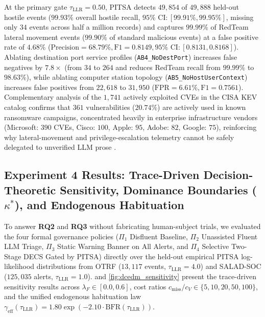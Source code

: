 \documentclass[11pt,a4paper]{article}
\let\oldtexttt\texttt
\renewcommand{\texttt}[1]{\textnormal{\oldtexttt{#1}}}
\begin{document}
At the primary gate $\tau_{\text{LLR}} = 0.50$, PITSA detects $49,854$ of $49,888$ held-out hostile events ($99.93\%$ overall hostile recall, $95\%\text{ CI}: [99.91\%, 99.95\%]$, missing only $34$ events across half a million records) and captures $99.99\%$ of RedTeam lateral movement events ($99.90\%$ of standard malicious events) at a false positive rate of $4.68\%$ ($\text{Precision} = 68.79\%, \text{F1} = 0.8149, 95\%\text{ CI}: [0.8131, 0.8168]$). Ablating destination port service profiles (\texttt{AB4\_NoDestPort}) increases false negatives by $7.8\times$ (from $34$ to $264$ and reduces RedTeam recall from $99.99\%$ to $98.63\%$), while ablating computer station topology (\texttt{AB5\_NoHostUserContext}) increases false positives from $22,618$ to $31,950$ ($\text{FPR} = 6.61\%, \text{F1} = 0.7561$). Complementary analysis of the $1,741$ actively exploited CVEs in the CISA KEV catalog confirms that $361$ vulnerabilities ($20.74\%$) are actively used in known ransomware campaigns, concentrated heavily in enterprise infrastructure vendors (Microsoft: $390$ CVEs, Cisco: $100$, Apple: $95$, Adobe: $82$, Google: $75$), reinforcing why lateral-movement and privilege-escalation telemetry cannot be safely delegated to unverified LLM prose \citep{li2022assessing, ampel2024improving}.

\subsection{Experiment 4 Results: Trace-Driven Decision-Theoretic Sensitivity, Dominance Boundaries \texorpdfstring{($\kappa^*$)}{(kappa*)}, and Endogenous Habituation}
\label{subsec:res_exp4}

To answer \textbf{RQ2} and \textbf{RQ3} without fabricating human-subject trials, we evaluated the four formal governance policies ($\Pi_1$ Disfluent Baseline, $\Pi_2$ Unassisted Fluent LLM Triage, $\Pi_3$ Static Warning Banner on All Alerts, and $\Pi_4$ Selective Two-Stage DECS Gated by PITSA) directly over the held-out empirical PITSA log-likelihood distributions from OTRF ($13,117$ events, $\tau_{\text{LLR}} = 4.0$) and SALAD-SOC ($125,035$ alerts, $\tau_{\text{LLR}} = 1.0$).  and \cref{fig:dcedm_sensitivity} present the trace-driven sensitivity results across $\lambda_F \in [0.0, 0.6]$, cost ratios $c_{\text{miss}} / c_V \in \{5, 10, 20, 50, 100\}$, and the unified endogenous habituation law $\gamma_{\text{eff}}(\tau_{\text{LLR}}) = 1.80 \exp(-2.10 \cdot \text{BFR}(\tau_{\text{LLR}}))$.
\end{document}
